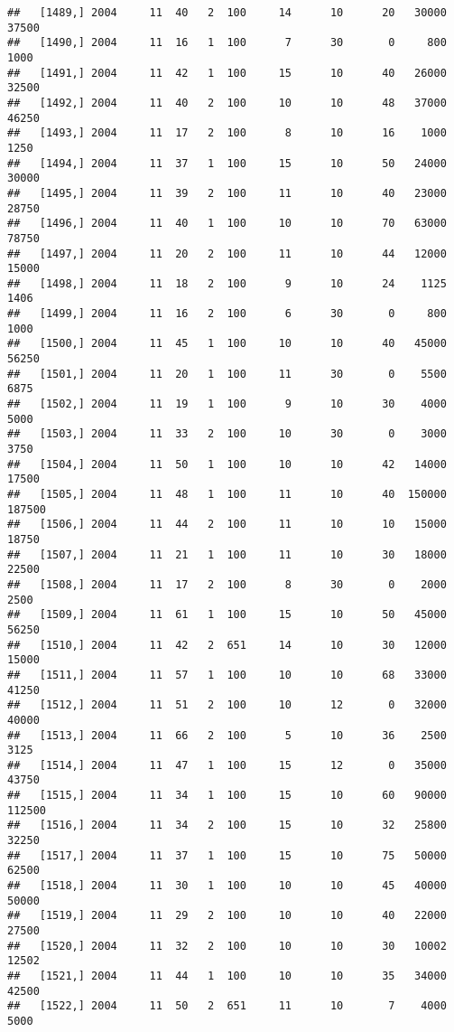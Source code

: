 \documentclass{article}\usepackage[]{graphicx}\usepackage[]{color}
\makeatletter
\newenvironment{kframe}{%
 \def\at@end@of@kframe{}%
 \ifinner\ifhmode%
  \def\at@end@of@kframe{\end{minipage}}%
  \begin{minipage}{\columnwidth}%
 \fi\fi%
 \def\FrameCommand##1{\hskip\@totalleftmargin \hskip-\fboxsep
 \colorbox{shadecolor}{##1}\hskip-\fboxsep
     \hskip-\linewidth \hskip-\@totalleftmargin \hskip\columnwidth}%
 \MakeFramed {\advance\hsize-\width
   \@totalleftmargin\z@ \linewidth\hsize
   \@setminipage}}%
 {\par\unskip\endMakeFramed%
 \at@end@of@kframe}
\newenvironment{knitrout}{}{} %
\makeatother
\begin{document}
\begin{knitrout}
\begin{kframe}
\begin{verbatim}
##   [1489,] 2004     11  40   2  100     14      10      20   30000   37500
##   [1490,] 2004     11  16   1  100      7      30       0     800    1000
##   [1491,] 2004     11  42   1  100     15      10      40   26000   32500
##   [1492,] 2004     11  40   2  100     10      10      48   37000   46250
##   [1493,] 2004     11  17   2  100      8      10      16    1000    1250
##   [1494,] 2004     11  37   1  100     15      10      50   24000   30000
##   [1495,] 2004     11  39   2  100     11      10      40   23000   28750
##   [1496,] 2004     11  40   1  100     10      10      70   63000   78750
##   [1497,] 2004     11  20   2  100     11      10      44   12000   15000
##   [1498,] 2004     11  18   2  100      9      10      24    1125    1406
##   [1499,] 2004     11  16   2  100      6      30       0     800    1000
##   [1500,] 2004     11  45   1  100     10      10      40   45000   56250
##   [1501,] 2004     11  20   1  100     11      30       0    5500    6875
##   [1502,] 2004     11  19   1  100      9      10      30    4000    5000
##   [1503,] 2004     11  33   2  100     10      30       0    3000    3750
##   [1504,] 2004     11  50   1  100     10      10      42   14000   17500
##   [1505,] 2004     11  48   1  100     11      10      40  150000  187500
##   [1506,] 2004     11  44   2  100     11      10      10   15000   18750
##   [1507,] 2004     11  21   1  100     11      10      30   18000   22500
##   [1508,] 2004     11  17   2  100      8      30       0    2000    2500
##   [1509,] 2004     11  61   1  100     15      10      50   45000   56250
##   [1510,] 2004     11  42   2  651     14      10      30   12000   15000
##   [1511,] 2004     11  57   1  100     10      10      68   33000   41250
##   [1512,] 2004     11  51   2  100     10      12       0   32000   40000
##   [1513,] 2004     11  66   2  100      5      10      36    2500    3125
##   [1514,] 2004     11  47   1  100     15      12       0   35000   43750
##   [1515,] 2004     11  34   1  100     15      10      60   90000  112500
##   [1516,] 2004     11  34   2  100     15      10      32   25800   32250
##   [1517,] 2004     11  37   1  100     15      10      75   50000   62500
##   [1518,] 2004     11  30   1  100     10      10      45   40000   50000
##   [1519,] 2004     11  29   2  100     10      10      40   22000   27500
##   [1520,] 2004     11  32   2  100     10      10      30   10002   12502
##   [1521,] 2004     11  44   1  100     10      10      35   34000   42500
##   [1522,] 2004     11  50   2  651     11      10       7    4000    5000

\end{verbatim}
\end{kframe}
\end{knitrout}
\end{document}
